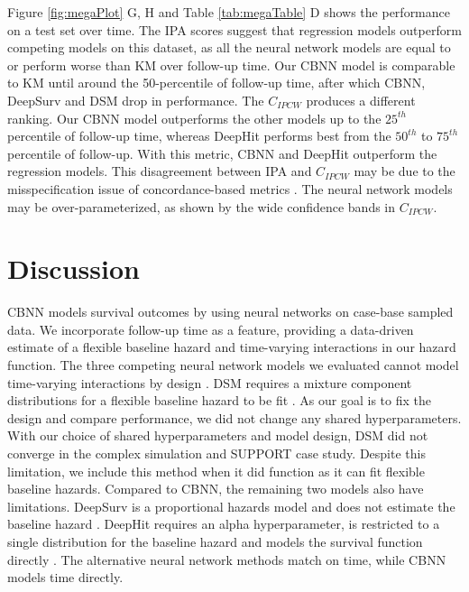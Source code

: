 \documentclass[APA,LATO1COL]{WileyNJD-v2}
\begin{document}
Figure \ref{fig:megaPlot} G, H and Table \ref{tab:megaTable} D shows the
performance on a test set over time. The IPA scores suggest that
regression models outperform competing models on this dataset, as all
the neural network models are equal to or perform worse than KM over
follow-up time. Our CBNN model is comparable to KM until around the
50-percentile of follow-up time, after which CBNN, DeepSurv and DSM drop
in performance. The \(C_{IPCW}\) produces a different ranking. Our CBNN
model outperforms the other models up to the \(25^{th}\) percentile of
follow-up time, whereas DeepHit performs best from the \(50^{th}\) to
\(75^{th}\) percentile of follow-up. With this metric, CBNN and DeepHit
outperform the regression models. This disagreement between IPA and
\(C_{IPCW}\) may be due to the misspecification issue of
concordance-based metrics \citep{cindexfails2019}. The neural network
models may be over-parameterized, as shown by the wide confidence bands
in \(C_{IPCW}\).




\hypertarget{discussion}{%
\section{Discussion}\label{discussion}}

CBNN models survival outcomes by using neural networks on case-base
sampled data. We incorporate follow-up time as a feature, providing a
data-driven estimate of a flexible baseline hazard and time-varying
interactions in our hazard function. The three competing neural network
models we evaluated cannot model time-varying interactions by design
\citep{dsmPaper} \citep{katzman2018DeepSurv} \citep{lee2018DeepHit}. DSM
requires a mixture component distributions for a flexible baseline
hazard to be fit \citep{dsmPaper}. As our goal is to fix the design and
compare performance, we did not change any shared hyperparameters. With
our choice of shared hyperparameters and model design, DSM did not
converge in the complex simulation and SUPPORT case study. Despite this
limitation, we include this method when it did function as it can fit
flexible baseline hazards. Compared to CBNN, the remaining two models
also have limitations. DeepSurv is a proportional hazards model and does
not estimate the baseline hazard \citep{katzman2018DeepSurv}. DeepHit
requires an alpha hyperparameter, is restricted to a single distribution
for the baseline hazard and models the survival function directly
\citep{lee2018DeepHit}. The alternative neural network methods match on
time, while CBNN models time directly.
\end{document}
